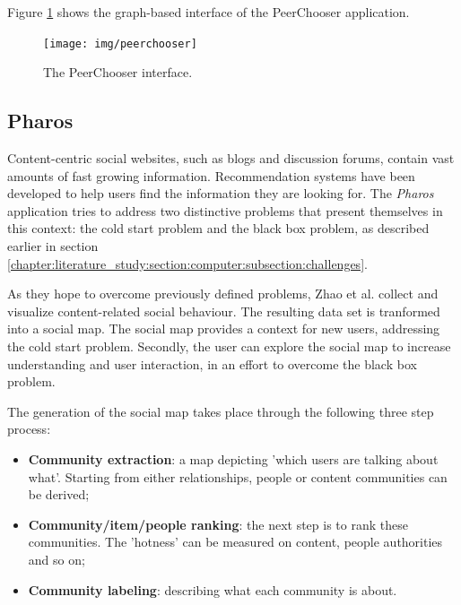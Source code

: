 Figure \ref{figure:peerchooser} shows the graph-based interface of the PeerChooser application.

\begin{figure}%
	\begin{center}
		\texttt{[image: img/peerchooser]}%
	\end{center}
	\caption{The PeerChooser interface.}%
	\label{figure:peerchooser}%
\end{figure}



\subsection{Pharos}\label{chapter:survey:section:applications:subsection:pharos}

Content-centric social websites, such as blogs and discussion forums, contain vast amounts of fast growing information. Recommendation systems have been developed to help users find the information they are looking for. The \emph{Pharos} application tries to address two distinctive problems that present themselves in this context: the cold start problem and the black box problem\cite{zhao:2010}, as described earlier in section \ref{chapter:literature_study:section:computer:subsection:challenges}.

As they hope to overcome previously defined problems, Zhao et al. \cite{zhao:2010} collect and visualize content-related social behaviour. The resulting data set is tranformed into a social map. The social map provides a context for new users, addressing the cold start problem. Secondly, the user can explore the social map to increase understanding and user interaction, in an effort to overcome the black box problem.

The generation of the social map takes place through the following three step process:

\begin{itemize}
	\item \textbf{Community extraction}: a map depicting 'which users are talking about what'. Starting from either relationships, people or content communities can be derived;
	\item \textbf{Community/item/people ranking}: the next step is to rank these communities. The 'hotness' can be measured on content, people authorities and so on;
	\item \textbf{Community labeling}: describing what each community is about.
\end{itemize}

